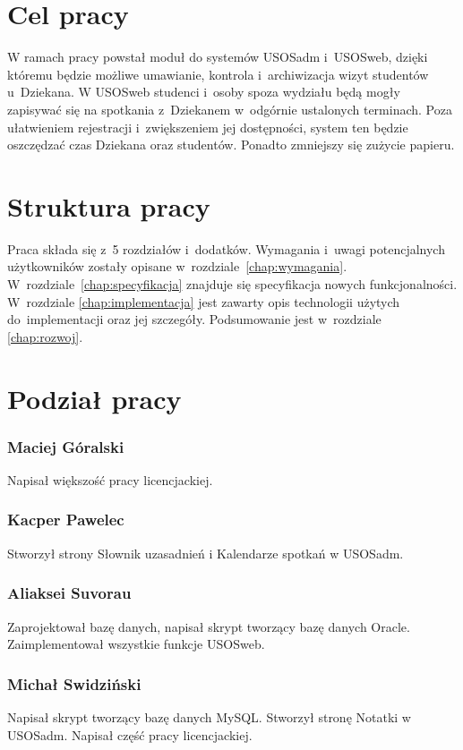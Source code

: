 \documentclass[licencjacka]{pracamgr}
\begin{document}
\section{Cel pracy}
W ramach pracy powstał moduł do systemów USOSadm i~USOSweb, dzięki któremu będzie możliwe umawianie, kontrola i~archiwizacja wizyt studentów u~Dziekana. W USOSweb studenci i~osoby spoza wydziału będą mogły zapisywać się na spotkania z~Dziekanem w~odgórnie ustalonych terminach. Poza ułatwieniem rejestracji i~zwiększeniem jej dostępności, system ten będzie oszczędzać czas Dziekana oraz studentów. Ponadto zmniejszy się zużycie papieru.
\section{Struktura pracy}
Praca składa się z~5 rozdziałów i~dodatków.
Wymagania i~uwagi potencjalnych użytkowników zostały opisane w~rozdziale~\ref{chap:wymagania}.
W~rozdziale~\ref{chap:specyfikacja} znajduje się specyfikacja nowych funkcjonalności. W~rozdziale \ref{chap:implementacja} jest zawarty opis technologii użytych do~implementacji oraz jej szczegóły. Podsumowanie jest w~rozdziale \ref{chap:rozwoj}.

\section{Podział pracy}
\subsubsection{Maciej Góralski}

Napisał większość pracy licencjackiej.
\subsubsection{Kacper Pawelec}

Stworzył strony Słownik uzasadnień i Kalendarze spotkań w USOSadm.
\subsubsection{Aliaksei Suvorau}

Zaprojektował bazę danych, napisał skrypt tworzący bazę danych Oracle. Zaimplementował wszystkie funkcje USOSweb.
\subsubsection{Michał Swidziński}

Napisał skrypt tworzący bazę danych MySQL. Stworzył stronę Notatki w USOSadm. Napisał część pracy licencjackiej.
\end{document}
